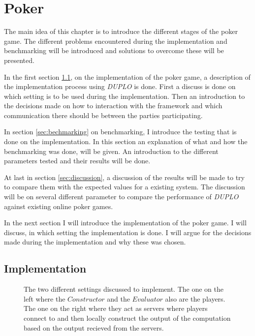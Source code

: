 \documentclass[twoside,11pt,openright]{report}
\newcommand{\DUPLO}{\textit{DUPLO} }
\begin{document}
\chapter{Poker}
\label{ch:implementation}
The main idea of this chapter is to introduce the different stages of the poker game. The different problems encountered during the implementation and benchmarking will be introduced and solutions to overcome these will be presented.

In the first section \ref{sec:poker_imp}, on the implementation of the poker game, a description of the implementation process using \DUPLO is done. First a discuss is done on which setting is to be used during the implementation. Then an introduction to the decisions made on how to interaction with the framework and which communication there should be between the parties participating.

In section \ref{sec:bechmarking} on benchmarking, I introduce the testing that is done on the implementation. In this section an explanation of what and how the benchmarking was done, will be given. An introduction to the different parameters tested and their results will be done.

At last in section \ref{sec:discussion}, a discussion of the results will be made to try to compare them with the expected values for a existing system. The discussion will be on several different parameter to compare the performance of \DUPLO against existing online poker games.

\bigskip

In the next section I will introduce the implementation of the poker game. I will discuss, in which setting the implementation is done. I will argue for the decisions made during the implementation and why these was chosen. 

\section{Implementation}
\label{sec:poker_imp}

\begin{figure}[t]
\centering

\caption{The two different settings discussed to implement. The one on the left where the $Constructor$ and the $Evaluator$ also are the players. The one on the right where they act as servers where players connect to and then locally construct the output of the computation based on the output recieved from the servers.}
\label{fig:poker_setting}
\end{figure}
\end{document}
